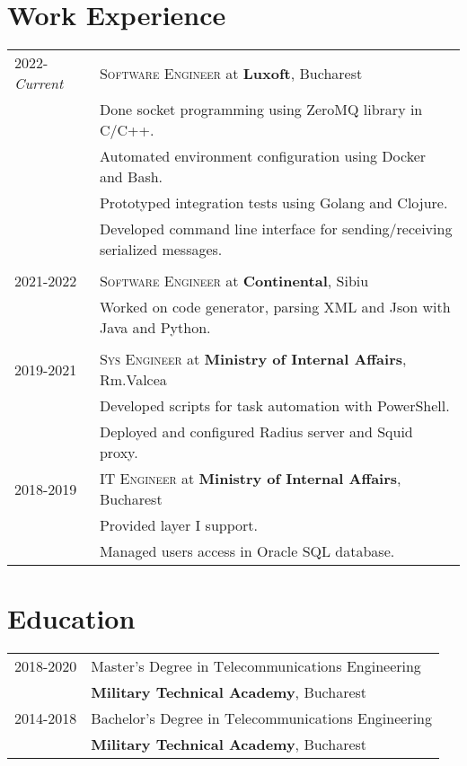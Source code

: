 \documentclass[a4paper,12pt]{article}
\newcommand{\tsc}{\textsc}
\begin{document}
\section{Work Experience}
    \begin{tabular}{p{3.1cm}|l}
        \raggedleft\tsc{2022-}\emph{Current}
        &\tsc{Software Engineer} at \textbf{Luxoft}, Bucharest\\
        &\footnotesize{Done socket programming using ZeroMQ library in C/C++.}\\
        &\footnotesize{Automated environment configuration using Docker and Bash.}\\
        &\footnotesize{Prototyped integration tests using Golang and Clojure.}\\
        &\footnotesize{Developed command line interface for sending/receiving serialized messages.}\\
        \multicolumn{2}{c}{}\\
        \raggedleft\tsc{2021-2022}
        &\tsc{Software Engineer} at \textbf{Continental}, Sibiu\\
        &\footnotesize{Worked on code generator, parsing XML and Json with Java and Python.}\\
        \multicolumn{2}{c}{}\\
        \raggedleft\tsc{2019-2021} 
          &\tsc{Sys Engineer} at \textbf{Ministry of Internal Affairs}, Rm.Valcea\\
        &\footnotesize{Developed scripts for task automation with PowerShell.}\\
        &\footnotesize{Deployed and configured Radius server and Squid proxy.}\\
        \raggedleft\tsc{2018-2019} 
        &\tsc{IT Engineer} at \textbf{Ministry of Internal Affairs}, Bucharest\\
        &\footnotesize{Provided layer I support.}\\
        &\footnotesize{Managed users access in Oracle SQL database.}\\
    \end{tabular}

\section{Education}
\begin{tabular}{p{3.1cm}|l}
    \raggedleft\tsc{2018-2020}&Master's Degree in \tsc{T}elecommunications \tsc{E}ngineering\\
        & \textbf{Military Technical Academy}, Bucharest\\
    \raggedleft\tsc{2014-2018}&Bachelor's Degree in \tsc{T}elecommunications \tsc{E}ngineering\\
        &\textbf{Military Technical Academy}, Bucharest\\
\end{tabular}
\end{document}
